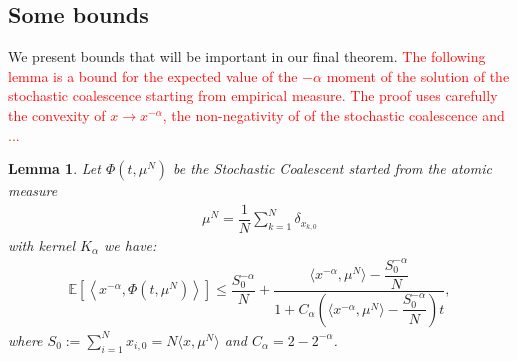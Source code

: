 \documentclass[11pt,a4paper]{article}
\newcommand{\red}[1]{\textcolor{red}{#1}}
\newcommand{\E}[1]{\mathbb{E}\left[#1\right]}
\newtheorem{lemma}[theorem]{Lemma}
\begin{document}
\subsection{Some bounds}
We present bounds that will be important in our final theorem.
\red{The following lemma is a bound for the expected value of the $-\alpha$ moment of the solution of the stochastic coalescence starting from empirical measure. The proof uses carefully the convexity of $x\to x^{-\alpha}$, the non-negativity of of the stochastic coalescence and ...}

\begin{lemma}
    Let $\Phi(t,\mu^N)$ be the Stochastic Coalescent started from the atomic measure 
    \begin{align*}
        \mu^N = \dfrac{1}{N}\sum\limits_{k = 1}^N \delta_{x_{k,0}}
    \end{align*}
    with kernel $K_\alpha$ we have:
    \begin{align*}
        \E{\left\langle x^{-\alpha},\Phi(t,\mu^N)\right\rangle} \leq \dfrac{S_0^{-\alpha}}{N} + \dfrac{\langle x^{-\alpha},\mu^N \rangle - \dfrac{S_0^{-\alpha}}{N}}{1 + C_\alpha \left(\langle x^{-\alpha},\mu^N \rangle - \dfrac{S_0^{-\alpha}}{N}\right)t},
    \end{align*}
    where $S_0 := \sum\limits_{i = 1}^N x_{i,0} = N\langle x,\mu^N\rangle$ and $C_\alpha = 2 - 2^{-\alpha}$.
\end{lemma}
\end{document}

